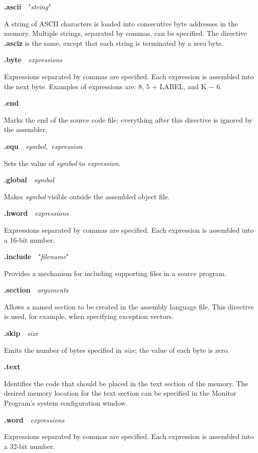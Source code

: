 \documentclass[11pt, twoside, pdftex]{article}
\begin{document}
\noindent
{\bf .ascii}~~"{\it string}"

\noindent
A string of ASCII characters is loaded into consecutive byte addresses in the memory.
Multiple strings, separated by commas, can be specified. The directive {\bf .asciz} is
the same, except that each string is terminated by a zero byte.

\noindent
{\bf .byte}~~{\it expressions}

\noindent
Expressions separated by commas are specified. Each expression is assembled into
the next byte. Examples of expressions are: 8, 5 + LABEL, and K $-$ 6.

\noindent
{\bf .end}
 
\noindent
Marks the end of the source code file; everything after this
directive is ignored by the assembler.
 
\noindent
{\bf .equ}~~{\it symbol,~expression}
 
\noindent
Sets the value of {\it symbol} to {\it expression}.
 
\noindent
{\bf .global}~~{\it symbol}

\noindent
Makes {\it symbol} visible outside the assembled object file.

\noindent
{\bf .hword}~~{\it expressions}

\noindent
Expressions separated by commas are specified. Each expression is assembled into
a 16-bit number.

\noindent
{\bf .include}~~"{\it filename}"

\noindent
Provides a mechanism for including supporting files in a source program.

\noindent
{\bf .section}~~{\it arguments}
 
\noindent
Allows a named section to be created in the assembly language file. This directive is
used, for example, when specifying exception vectors.

\noindent
{\bf .skip}~~{\it size}
 
\noindent
Emits the number of bytes specified in {\it size}; the value of each byte is zero.

\noindent
{\bf .text}

\noindent
Identifies the code that should be placed in the text section of the memory.
The desired memory location for the text section can be specified in the
Monitor Program's system configuration window.

\noindent
{\bf .word}~~{\it expressions}

\noindent
Expressions separated by commas are specified. Each expression is assembled into
a 32-bit number.
\end{document}
